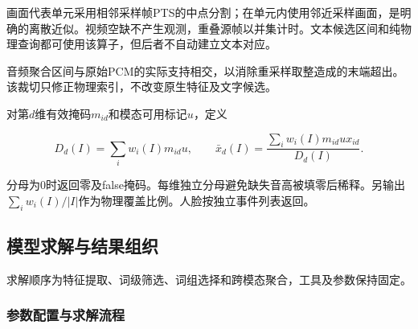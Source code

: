 画面代表单元采用相邻采样帧PTS的中点分割；在单元内使用邻近采样画面，是明确的离散近似。视频空缺不产生观测，重叠源帧以并集计时。文本候选区间和纯物理查询都可使用该算子，但后者不自动建立文本对应。

音频聚合区间与原始PCM的实际支持相交，以消除重采样取整造成的末端超出。该裁切只修正物理索引，不改变原生特征及文字候选。

对第\(d\)维有效掩码\(m_{id}\)和模态可用标记\(u\)，定义

\begin{equation}D_d(I)=\sum_iw_i(I)m_{id}u,\qquad\bar x_d(I)=\frac{\sum_iw_i(I)m_{id}u x_{id}}{D_d(I)}.\end{equation}

分母为0时返回零及false掩码。每维独立分母避免缺失音高被填零后稀释。另输出\(\sum_iw_i(I)/|I|\)作为物理覆盖比例。人脸按独立事件列表返回。

\hypertarget{q1-ux6a21ux578bux6c42ux89e3ux4e0eux7ed3ux679cux7ec4ux7ec7}{%
\subsection{模型求解与结果组织}\label{q1-ux6a21ux578bux6c42ux89e3ux4e0eux7ed3ux679cux7ec4ux7ec7}}

求解顺序为特征提取、词级筛选、词组选择和跨模态聚合，工具及参数保持固定。

\hypertarget{q1-ux53c2ux6570ux914dux7f6eux4e0eux6c42ux89e3ux6d41ux7a0b}{%
\subsubsection{参数配置与求解流程}\label{q1-ux53c2ux6570ux914dux7f6eux4e0eux6c42ux89e3ux6d41ux7a0b}}


